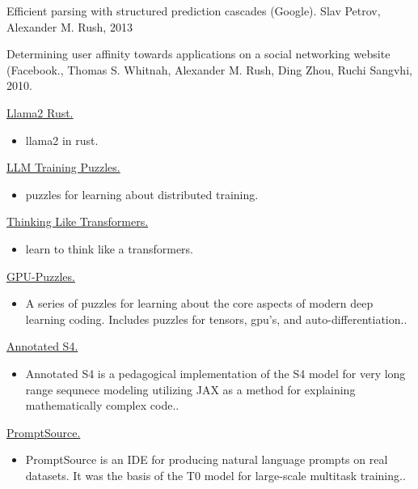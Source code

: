 \documentclass[10pt]{article}
\begin{document}
\ind Efficient parsing with structured prediction cascades (Google). Slav Petrov, Alexander M. Rush, 2013
\medskip

\ind  Determining user affinity towards applications on a social networking website (Facebook., Thomas S. Whitnah, Alexander M. Rush, Ding Zhou, Ruchi Sangvhi, 2010.



\bigskip


\bigskip

\ind \href{ paper.link } { Llama2 Rust. }
\begin{itemize}
\item llama2 in rust.
\end{itemize}
\medskip


\ind \href{ paper.link } { LLM Training Puzzles. }
\begin{itemize}
\item puzzles for learning about distributed training.
\end{itemize}
\medskip


\ind \href{ paper.link } { Thinking Like Transformers. }
\begin{itemize}
\item learn to think like a transformers.
\end{itemize}
\medskip


\ind \href{ paper.link } { GPU-Puzzles. }
\begin{itemize}
\item A series of puzzles for learning about the core aspects of modern deep learning coding. Includes puzzles for tensors, gpu's, and auto-differentiation..
\end{itemize}
\medskip


\ind \href{ paper.link } { Annotated S4. }
\begin{itemize}
\item Annotated S4 is a pedagogical implementation of the S4 model for very long range sequnece modeling utilizing JAX as a method for explaining mathematically complex code..
\end{itemize}
\medskip


\ind \href{ paper.link } { PromptSource. }
\begin{itemize}
\item PromptSource is an IDE for producing natural language prompts on real datasets. It was the basis of the T0 model for large-scale multitask training..
\end{itemize}
\medskip
\end{document}
